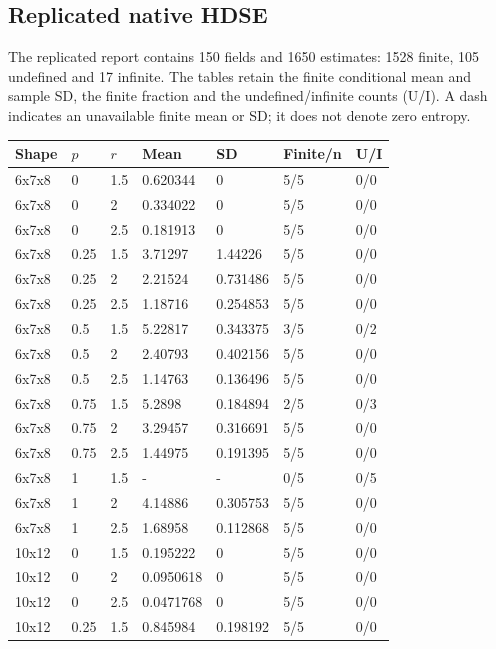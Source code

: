 \documentclass[
  english,
  11pt,
]{article}
\newcounter{none} %
\begin{document}
\subsection{Replicated native HDSE}\label{replicated-native-hdse}

The replicated report contains 150 fields and 1650 estimates: 1528
finite, 105 undefined and 17 infinite. The tables retain the finite
conditional mean and sample SD, the finite fraction and the
undefined/infinite counts (U/I). A dash indicates an unavailable finite
mean or SD; it does not denote zero entropy.

{\def\LTcaptype{none} %
\begin{longtable}[]{@{}lllllll@{}}
\toprule\noalign{}
Shape & \(p\) & \(r\) & Mean & SD & Finite/n & U/I \\
\midrule\noalign{}
\endhead
\bottomrule\noalign{}
\endlastfoot
6x7x8 & 0 & 1.5 & 0.620344 & 0 & 5/5 & 0/0 \\
6x7x8 & 0 & 2 & 0.334022 & 0 & 5/5 & 0/0 \\
6x7x8 & 0 & 2.5 & 0.181913 & 0 & 5/5 & 0/0 \\
6x7x8 & 0.25 & 1.5 & 3.71297 & 1.44226 & 5/5 & 0/0 \\
6x7x8 & 0.25 & 2 & 2.21524 & 0.731486 & 5/5 & 0/0 \\
6x7x8 & 0.25 & 2.5 & 1.18716 & 0.254853 & 5/5 & 0/0 \\
6x7x8 & 0.5 & 1.5 & 5.22817 & 0.343375 & 3/5 & 0/2 \\
6x7x8 & 0.5 & 2 & 2.40793 & 0.402156 & 5/5 & 0/0 \\
6x7x8 & 0.5 & 2.5 & 1.14763 & 0.136496 & 5/5 & 0/0 \\
6x7x8 & 0.75 & 1.5 & 5.2898 & 0.184894 & 2/5 & 0/3 \\
6x7x8 & 0.75 & 2 & 3.29457 & 0.316691 & 5/5 & 0/0 \\
6x7x8 & 0.75 & 2.5 & 1.44975 & 0.191395 & 5/5 & 0/0 \\
6x7x8 & 1 & 1.5 & - & - & 0/5 & 0/5 \\
6x7x8 & 1 & 2 & 4.14886 & 0.305753 & 5/5 & 0/0 \\
6x7x8 & 1 & 2.5 & 1.68958 & 0.112868 & 5/5 & 0/0 \\
10x12 & 0 & 1.5 & 0.195222 & 0 & 5/5 & 0/0 \\
10x12 & 0 & 2 & 0.0950618 & 0 & 5/5 & 0/0 \\
10x12 & 0 & 2.5 & 0.0471768 & 0 & 5/5 & 0/0 \\
10x12 & 0.25 & 1.5 & 0.845984 & 0.198192 & 5/5 & 0/0 \\

\end{longtable}}
\end{document}
